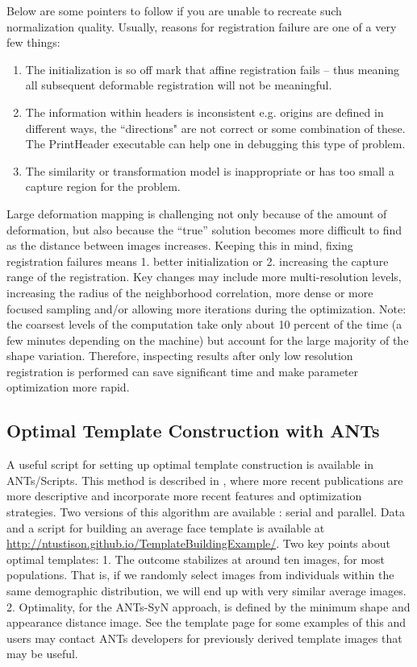 \documentclass{InsightArticle}
\begin{document}
Below are some pointers to follow if you are unable to recreate such normalization quality.  
Usually, reasons for registration failure are one of a very few things: 
\begin{enumerate}
\item The initialization is so off mark that affine registration fails -- thus meaning all subsequent deformable registration will not be meaningful.
\item The information within headers is inconsistent e.g. origins are defined in different ways, the ``directions" are not correct or some combination of these.    The PrintHeader executable can help one in debugging this type of problem.  
\item  The similarity or transformation model is inappropriate or has too small a capture region for the problem. 
\end{enumerate}

Large deformation mapping is challenging not only because of the
amount of deformation, but also because the ``true'' solution becomes
more difficult to find as the distance between images increases.
Keeping this in mind, fixing registration failures means 1. better
initialization or 2. increasing the capture range of the registration. 
Key changes may include more multi-resolution levels, increasing the radius of the neighborhood
correlation, more dense or more focused sampling and/or 
allowing more iterations during the optimization.  
Note: the coarsest levels of the computation take only about
10 percent of the time (a few minutes depending on the machine)
but account for the large majority of the shape variation.  Therefore,
inspecting results after only low resolution registration is performed
can save significant time and make parameter optimization more rapid.

\subsection{Optimal Template Construction with ANTs}
A useful script for setting up optimal template construction
 is available in ANTs/Scripts.  This method is described in \cite{Avants2004,Avants2006d,Kim2008,Yushkevich2009,Avants2009c}, 
where more recent publications are more descriptive and incorporate 
more recent features and optimization strategies. 
Two versions of this algorithm are available : serial and parallel.  
Data and a script for building an average face template is available 
at \href{http://ntustison.github.io/TemplateBuildingExample/}{http://ntustison.github.io/TemplateBuildingExample/}.  Two key points about optimal templates:
1. The outcome stabilizes at around ten images, for most populations.
That is, if we randomly select images from individuals within the same 
demographic distribution, we will end up with very similar average images.  
2.  Optimality, for the ANTs-SyN approach, is defined by the minimum shape 
and appearance distance image. 
See the template page for some examples of this and users may 
contact ANTs developers for previously derived template 
images that may be useful. 
\end{document}
